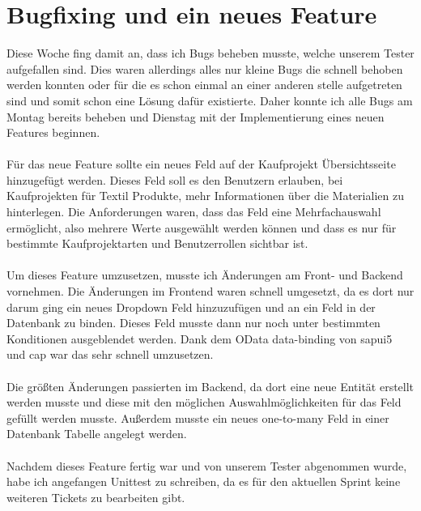 \section{Bugfixing und ein neues Feature}
Diese Woche fing damit an, dass ich Bugs beheben musste, welche unserem Tester aufgefallen sind. Dies waren allerdings alles nur kleine Bugs die schnell behoben werden konnten oder für die es schon einmal an einer anderen stelle aufgetreten sind und somit schon eine Lösung dafür existierte. Daher konnte ich alle Bugs am Montag bereits beheben und Dienstag mit der Implementierung eines neuen Features beginnen. \\\\
Für das neue Feature sollte ein neues Feld auf der Kaufprojekt Übersichtsseite hinzugefügt werden. Dieses Feld soll es den Benutzern erlauben, bei Kaufprojekten für Textil Produkte, mehr Informationen über die Materialien zu hinterlegen. Die Anforderungen waren, dass das Feld eine Mehrfachauswahl ermöglicht, also mehrere Werte ausgewählt werden können und dass es nur für bestimmte Kaufprojektarten und Benutzerrollen sichtbar ist. \\\\
Um dieses Feature umzusetzen, musste ich Änderungen am Front- und Backend vornehmen. Die Änderungen im Frontend waren schnell umgesetzt, da es dort nur darum ging ein neues Dropdown Feld hinzuzufügen und an ein Feld in der Datenbank zu binden. Dieses Feld musste dann nur noch unter bestimmten Konditionen ausgeblendet werden. Dank dem OData data-binding von \gls{sapui5} und \gls{cap} war das sehr schnell umzusetzen. \\\\
Die größten Änderungen passierten im Backend, da dort eine neue Entität erstellt werden musste und diese mit den möglichen Auswahlmöglichkeiten für das Feld gefüllt werden musste. Außerdem musste ein neues one-to-many Feld in einer Datenbank Tabelle angelegt werden. \\\\
Nachdem dieses Feature fertig war und von unserem Tester abgenommen wurde, habe ich angefangen Unittest zu schreiben, da es für den aktuellen Sprint keine weiteren Tickets zu bearbeiten gibt. \\\\

